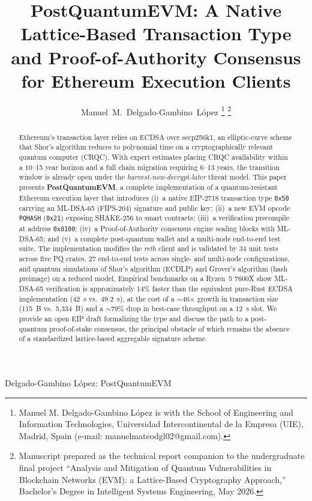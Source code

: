 \documentclass[journal,onecolumn,11pt]{IEEEtran}
\begin{document}
\title{PostQuantumEVM: A Native Lattice-Based Transaction Type and Proof-of-Authority Consensus for Ethereum Execution Clients}

\author{%
  Manuel~M.~Delgado-Gambino~L\'opez%
  \thanks{Manuel M. Delgado-Gambino L\'opez is with the School of Engineering and Information Technologies, Universidad Intercontinental de la Empresa (UIE), Madrid, Spain (e-mail: manuelmateodgl02@gmail.com).}%
  \thanks{Manuscript prepared as the technical report companion to the undergraduate final project ``Analysis and Mitigation of Quantum Vulnerabilities in Blockchain Networks (EVM): a Lattice-Based Cryptography Approach,'' Bachelor's Degree in Intelligent Systems Engineering, May 2026.}%
}

%
{Delgado-Gambino L\'opez: PostQuantumEVM}

\maketitle

\begin{abstract}
Ethereum's transaction layer relies on ECDSA over secp256k1, an elliptic-curve scheme that Shor's algorithm reduces to polynomial time on a cryptographically relevant quantum computer (CRQC). With expert estimates placing CRQC availability within a 10--15 year horizon and a full chain migration requiring 6--13 years, the transition window is already open under the \emph{harvest-now-decrypt-later} threat model. This paper presents \textbf{PostQuantumEVM}, a complete implementation of a quantum-resistant Ethereum execution layer that introduces (i)~a native EIP-2718 transaction type \texttt{0x50} carrying an ML-DSA-65 (FIPS-204) signature and public key; (ii)~a new EVM opcode \texttt{PQHASH} (\texttt{0x21}) exposing SHAKE-256 to smart contracts; (iii)~a verification precompile at address \texttt{0x0100}; (iv)~a Proof-of-Authority consensus engine sealing blocks with ML-DSA-65; and (v)~a complete post-quantum wallet and a multi-node end-to-end test suite. The implementation modifies the \emph{reth} client and is validated by 34 unit tests across five PQ crates, 27 end-to-end tests across single- and multi-node configurations, and quantum simulations of Shor's algorithm (ECDLP) and Grover's algorithm (hash preimage) on a reduced model. Empirical benchmarks on a Ryzen~5 7600X show ML-DSA-65 verification is approximately 14\% faster than the equivalent pure-Rust ECDSA implementation (42~\textmu s vs.\ 49.2~\textmu s), at the cost of a $\sim$46$\times$ growth in transaction size (115~B vs.\ 5{,}334~B) and a $\sim$79\% drop in best-case throughput on a 12~s slot. We provide an open EIP draft formalizing the type and discuss the path to a post-quantum proof-of-stake consensus, the principal obstacle of which remains the absence of a standardized lattice-based aggregable signature scheme.
\end{abstract}
\end{document}
